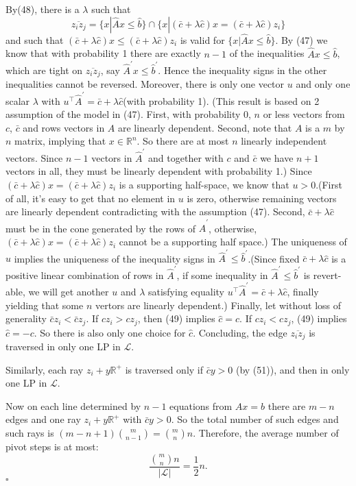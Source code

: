 \documentclass{article}
\newenvironment{proof}{{\it Proof.}}{ \hfill $\square$}
\def\R{{\mathbb R}}
\begin{document}
\begin{proof}
By(48), there is a $\lambda$ such that
\begin{equation}
\overline{z_i z_j}=\{x|\hat{A}x\leqslant \hat{b}\}\cap\{x|(\bar{c}+\lambda\hat{c})x=(\bar{c}+\lambda\hat{c})z_i\}
\end{equation}
and such that $(\bar{c}+\lambda\hat{c})x\leqslant(\bar{c}+\lambda\hat{c})z_i$ is valid for $\{x|\hat{A}x\leqslant\hat{b}\}$. By (47) we know that with probability 1 there are exactly $n-1$ of the inequalities $\hat{A}x\leqslant\hat{b}$, which are tight on $\overline{z_i z_j}$, say $\hat{A}^\prime x\leqslant\hat{b}^\prime$. Hence the inequality signs in the other inequalities cannot be reversed. Moreover, there is only one vector $u$ and only one scalar $\lambda$ with $u^\top\hat{A}^\prime=\bar{c}+\lambda\hat{c}$(with probability 1). (This result is based on 2 assumption of the model in (47). First, with probability 0, $n$ or less vectors from $c$, $\bar{c}$ and rows vectors in $A$ are linearly dependent. Second, note that $A$ is a $m$ by $n$ matrix, implying that $x\in \R^n$. So there are at most $n$ linearly independent vectors. Since $n-1$ vectors in $\hat{A}^\prime$ and together with $c$ and $\bar{c}$ we have $n+1$ vectors in all, they must be linearly dependent with probability 1.)
Since $(\bar{c}+\lambda\hat{c})x=(\bar{c}+\lambda\hat{c})z_i$ is a supporting half-space, we know that $u>0$.(First of all, it's easy to get that no element in $u$ is zero, otherwise remaining vectors are linearly dependent contradicting with the assumption (47). Second, $\bar{c}+\lambda\hat{c}$ must be in the cone generated by the rows of $\hat{A}^\prime$, otherwise, $(\bar{c}+\lambda\hat{c})x=(\bar{c}+\lambda\hat{c})z_i$ cannot be a supporting half space.) The uniqueness of $u$ implies the uniqueness of the inequality signs in $\hat{A}^\prime\leqslant\hat{b}^\prime$.(Since fixed $\bar{c}+\lambda\hat{c}$ is a positive linear combination of rows in $\hat{A}^\prime$, if some inequality in $\hat{A}^\prime\leqslant\hat{b}^\prime$ is revert-able, we will get another $u$ and $\lambda$ satisfying equality $u^\top\hat{A}^\prime=\bar{c}+\lambda\hat{c}$, finally yielding that some $n$ vertors are linearly dependent.) Finally, let without loss of generality $\bar{c}z_i<\bar{c}z_j$. If $cz_i>cz_j$, then (49) implies $\hat{c}=c$. If $cz_i<cz_j$, (49) implies $\hat{c}=-c$. So there is also only one choice for $\hat{c}$. Concluding, the edge $\overline{z_i z_j}$ is traversed in only one LP in $\mathcal{L}$.

Similarly, each ray $z_i+y\R^+$ is traversed only if $\bar{c}y>0$ (by (51)), and then in only one LP in $\mathcal{L}$.

Now on each line determined by $n-1$ equations from $Ax=b$ there are $m-n$ edges and one ray $z_i+y\R^+$ with $\bar{c}y>0$. So the total number of such edges and such rays is $(m-n+1)\binom{m}{n-1}=\binom{m}{n} n$. Therefore, the average number of pivot steps is at most:
\begin{equation}
\frac{\binom{m}{n}n}{\lvert \mathcal{L} \rvert}=\frac{1}{2}n.
\end{equation}
\end{proof}
\end{document}
